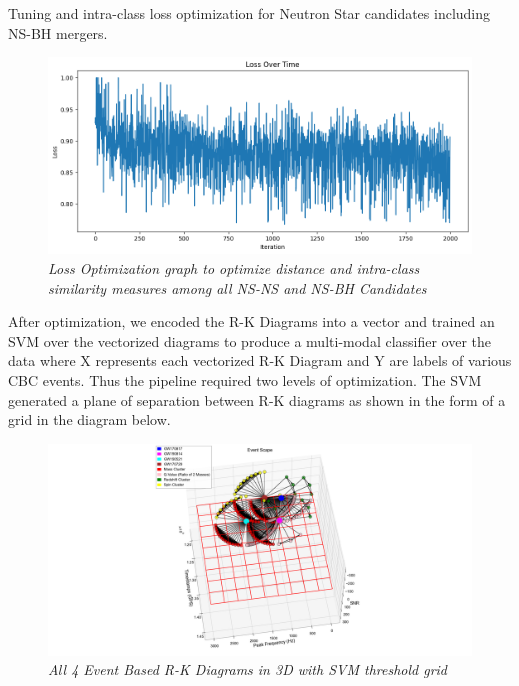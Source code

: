 Tuning and intra-class loss optimization for Neutron Star candidates including NS-BH mergers. 

\begin{figure}[H]
        \centering
 	\includegraphics[width=1.0\linewidth]{images/IntraClass_Tuning&Loss_for_NS.png}
 	\caption{\textit{Loss Optimization graph to optimize distance and intra-class similarity measures among all NS-NS and NS-BH Candidates}}
 	\label{fig:Intra-class_NS_Loss}
\end{figure}

After optimization, we encoded the R-K Diagrams into a vector and trained an SVM over the vectorized diagrams to produce a multi-modal classifier over the data where X represents each vectorized R-K Diagram and Y are labels of
various CBC events. Thus the pipeline required two levels of optimization. The SVM generated a plane of separation between R-K diagrams as shown in the form of a grid in the diagram below.

\begin{figure}[H]
        \centering
 	\includegraphics[width=1.0\linewidth]{images/75_34_All-4-Diagrmas-in-3D_with-SNR_3.png}
 	\caption{\textit{All 4 Event Based R-K Diagrams in 3D with SVM threshold grid}}
 	\label{fig:LIGO16_PlaceHolder_fig}
\end{figure}

